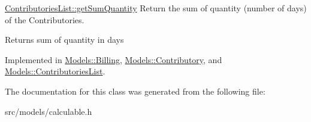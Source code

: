 \hyperlink{classModels_1_1ContributoriesList_af9b3b1b703cebeef552d058999ffcc4c}{Contributories\+List\+::get\+Sum\+Quantity} Return the sum of quantity (number of days) of the Contributories. 

\begin{DoxyReturn}{Returns}
sum of quantity in days 
\end{DoxyReturn}


Implemented in \hyperlink{classModels_1_1Billing_a360006189d4867e3281009b0c465bc53}{Models\+::\+Billing}, \hyperlink{classModels_1_1Contributory_aa6f3e9018846a83d192b8fb427fe0481}{Models\+::\+Contributory}, and \hyperlink{classModels_1_1ContributoriesList_af9b3b1b703cebeef552d058999ffcc4c}{Models\+::\+Contributories\+List}.



The documentation for this class was generated from the following file\+:\begin{DoxyCompactItemize}
\item 
src/models/calculable.\+h\end{DoxyCompactItemize}
